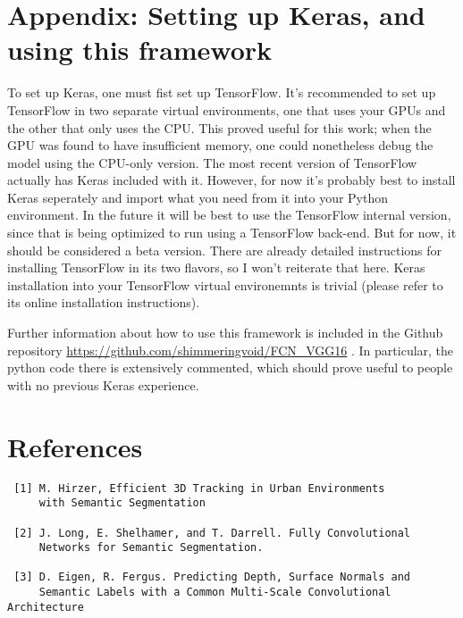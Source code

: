 \section{Appendix: Setting up Keras, and using this framework}

To set up Keras, one must fist set up TensorFlow. It's recommended to set up TensorFlow in two separate
virtual environments, one that uses your GPUs and the other that only uses the CPU. This proved useful
for this work; when the GPU was found to have insufficient memory, one could nonetheless debug the model
using the CPU-only version. The most recent version of TensorFlow actually has Keras included with it.
However, for now it's probably best to install Keras seperately and import what you need from it into
your Python environment. In the future it will be best to use the TensorFlow internal version, since that
is being optimized to run using a TensorFlow back-end. But for now, it should be considered a beta version.
There are already detailed instructions for installing TensorFlow in its two flavors, so I won't reiterate
that here. Keras installation into your TensorFlow virtual environemnts is trivial (please refer to its 
online installation instructions).

Further information about how to use this framework is included in the Github repository \url{https://github.com/shimmeringvoid/FCN_VGG16} .
In particular, the python code there is extensively commented, which should prove useful to people with
no previous Keras experience.


\section{References}
\begin{Verbatim}
 [1] M. Hirzer, Efficient 3D Tracking in Urban Environments 
     with Semantic Segmentation
 
 [2] J. Long, E. Shelhamer, and T. Darrell. Fully Convolutional 
     Networks for Semantic Segmentation.
 
 [3] D. Eigen, R. Fergus. Predicting Depth, Surface Normals and 
     Semantic Labels with a Common Multi-Scale Convolutional Architecture
\end{Verbatim}




